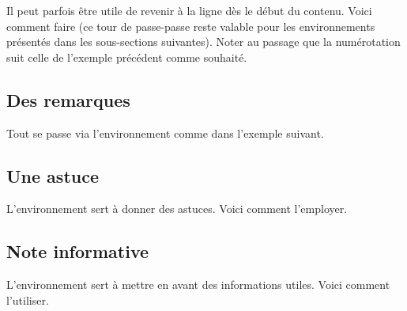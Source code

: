 

\begin{bdoctip}
    Il peut parfois être utile de revenir à la ligne dès le début du contenu. Voici comment faire (ce tour de passe-passe reste valable pour les environnements présentés dans les sous-sections suivantes). Noter au passage que la numérotation suit celle de l'exemple précédent comme souhaité.

\end{bdoctip}



\subsection{Des remarques}

Tout se passe via l'environnement  comme dans l'exemple suivant.




\subsection{Une astuce}

L'environnement  sert à donner des astuces. Voici comment l'employer.




\subsection{Note informative}

L'environnement  sert à mettre en avant des informations utiles. Voici comment l'utiliser.



